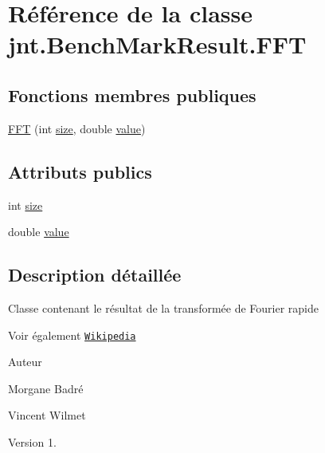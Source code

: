 \hypertarget{classjnt_1_1BenchMarkResult_1_1FFT}{\section{Référence de la classe jnt.\-Bench\-Mark\-Result.\-F\-F\-T}
\label{classjnt_1_1BenchMarkResult_1_1FFT}
}
\subsection*{Fonctions membres publiques}
\begin{DoxyCompactItemize}
\item 
\hyperlink{classjnt_1_1BenchMarkResult_1_1FFT_a951e35a28881893fdb76e814610e3e11}{F\-F\-T} (int \hyperlink{classjnt_1_1BenchMarkResult_1_1FFT_acc0bca368a4bfdb56b201dfe63761240}{size}, double \hyperlink{classjnt_1_1BenchMarkResult_1_1FFT_a29dfcf6e85f193893099ebd1d998314a}{value})
\end{DoxyCompactItemize}
\subsection*{Attributs publics}
\begin{DoxyCompactItemize}
\item 
int \hyperlink{classjnt_1_1BenchMarkResult_1_1FFT_acc0bca368a4bfdb56b201dfe63761240}{size}
\item 
double \hyperlink{classjnt_1_1BenchMarkResult_1_1FFT_a29dfcf6e85f193893099ebd1d998314a}{value}
\end{DoxyCompactItemize}


\subsection{Description détaillée}
Classe contenant le résultat de la transformée de Fourier rapide \begin{DoxySeeAlso}{Voir également}
\href{http://fr.wikipedia.org/wiki/Transform%C3%A9e_de_Fourier_rapide}{\tt Wikipedia} 
\end{DoxySeeAlso}
\begin{DoxyAuthor}{Auteur}

\begin{DoxyItemize}
\item Morgane Badré 
\item Vincent Wilmet 
\end{DoxyItemize}
\end{DoxyAuthor}
\begin{DoxyVersion}{Version}
1. 
\end{DoxyVersion}


